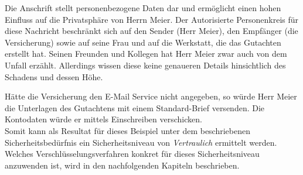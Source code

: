 \documentclass  [paper=a4,
				fontsize=12pt,
				listof=totoc,
				bibliography=totoc
				]{scrreprt}
\begin{document}
		Die Anschrift stellt personenbezogene Daten dar und ermöglicht einen hohen Einfluss auf die Privatsphäre von Herrn Meier.
		Der Autorisierte Personenkreis für diese Nachricht beschränkt sich auf den Sender (Herr Meier), den Empfänger (die Versicherung) sowie auf seine Frau und auf die Werkstatt, die das Gutachten erstellt hat. Seinen Freunden und Kollegen hat Herr Meier zwar auch von dem Unfall erzählt. Allerdings wissen diese keine genaueren Details hinsichtlich des Schadens und dessen Höhe.
		
		Hätte die Versicherung den E-Mail Service nicht angegeben, so würde Herr Meier die Unterlagen des Gutachtens mit einem Standard-Brief versenden. Die Kontodaten würde er mittels Einschreiben verschicken.
		\medskip\\
		
		Somit kann als Resultat für dieses Beispiel unter dem beschriebenen Sicherheitsbedürfnis ein Sicherheitsniveau von \textit{Vertraulich} ermittelt werden. Welches Verschlüsselungsverfahren konkret für dieses Sicherheitsniveau anzuwenden ist, wird in den nachfolgenden Kapiteln beschrieben.
		
\end{document}
